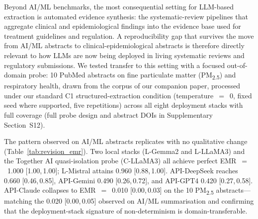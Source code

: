 \documentclass[sn-nature]{sn-jnl}
\begin{document}
Beyond AI/ML benchmarks, the most consequential setting for LLM-based extraction is automated evidence synthesis: the systematic-review pipelines that aggregate clinical and epidemiological findings into the evidence base used for treatment guidelines and regulation.
A reproducibility gap that survives the move from AI/ML abstracts to clinical-epidemiological abstracts is therefore directly relevant to how LLMs are now being deployed in living systematic reviews and regulatory submissions.
We tested transfer to this setting with a focused out-of-domain probe: 10 PubMed abstracts on fine particulate matter (PM\textsubscript{2.5}) and respiratory health, drawn from the corpus of our companion paper\cite{rover2026evidence}, processed under our standard C1 structured-extraction condition (temperature~$=$~0, fixed seed where supported, five repetitions) across all eight deployment stacks with full coverage (full probe design and abstract DOIs in Supplementary Section~S12).

The pattern observed on AI/ML abstracts replicates with no qualitative change (Table~\ref{tab:revision_emr}).
Two local stacks (L-Gemma2 and L-LLaMA3) and the Together AI quasi-isolation probe (C-LLaMA3) all achieve perfect EMR~$=$~1.000 [1.00,\,1.00]; L-Mistral attains 0.960 [0.88,\,1.00].
API-DeepSeek reaches 0.660 [0.46,\,0.85], API-Gemini 0.490 [0.26,\,0.72], and API-GPT4 0.420 [0.27,\,0.58].
API-Claude collapses to EMR~$=$~0.010 [0.00,\,0.03] on the 10 PM\textsubscript{2.5} abstracts---matching the 0.020 [0.00,\,0.05] observed on AI/ML summarisation and confirming that the deployment-stack signature of non-determinism is domain-transferable.
\end{document}
